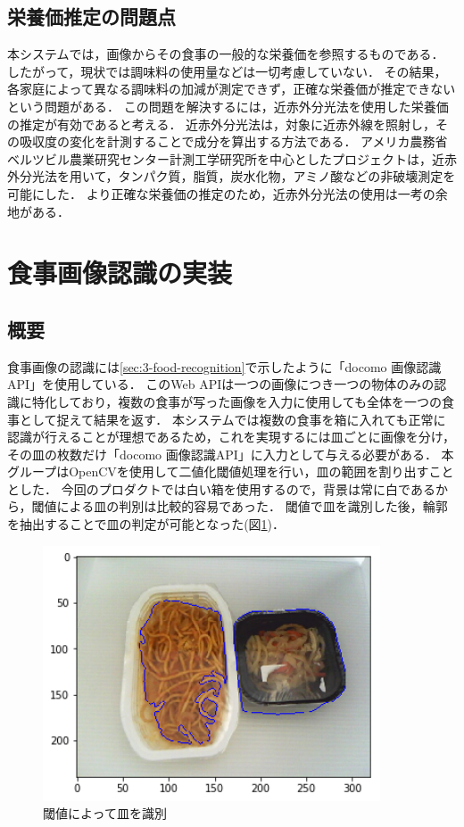 \documentclass[../report]{subfiles}
\begin{document}
\subsection{栄養価推定の問題点}
本システムでは，画像からその食事の一般的な栄養価を参照するものである．
したがって，現状では調味料の使用量などは一切考慮していない．
その結果，各家庭によって異なる調味料の加減が測定できず，正確な栄養価が推定できないという問題がある．
この問題を解決するには，近赤外分光法を使用した栄養価の推定が有効であると考える．
近赤外分光法は，対象に近赤外線を照射し，その吸収度の変化を計測することで成分を算出する方法である．
アメリカ農務省ベルツビル農業研究センター計測工学研究所を中心としたプロジェクトは，近赤外分光法を用いて，タンパク質，脂質，炭水化物，アミノ酸などの非破壊測定を可能にした\cite{hooton}\cite{norris}．
より正確な栄養価の推定のため，近赤外分光法の使用は一考の余地がある．


\section{食事画像認識の実装} \label{sec:6-food-recognition}
\subsection{概要}
食事画像の認識には\ref{sec:3-food-recognition}で示したように「docomo 画像認識API」を使用している．
このWeb APIは一つの画像につき一つの物体のみの認識に特化しており，複数の食事が写った画像を入力に使用しても全体を一つの食事として捉えて結果を返す．
本システムでは複数の食事を箱に入れても正常に認識が行えることが理想であるため，これを実現するには皿ごとに画像を分け，その皿の枚数だけ「docomo 画像認識API」に入力として与える必要がある．
本グループはOpenCVを使用して二値化閾値処理を行い，皿の範囲を割り出すこととした．
今回のプロダクトでは白い箱を使用するので，背景は常に白であるから，閾値による皿の判別は比較的容易であった．
閾値で皿を識別した後，輪郭を抽出することで皿の判定が可能となった(図\ref{fig:6-threshold})．

\begin{figure}[htbp]
    \begin{center}
        \includegraphics[width=10cm]{imgs/6_threshold.png}
        \caption{閾値によって皿を識別}
        \label{fig:6-threshold}
    \end{center}
\end{figure}
\end{document}
